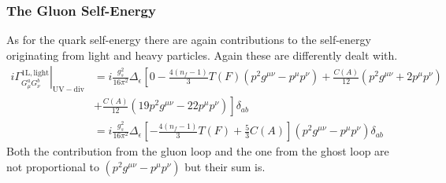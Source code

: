 \subsubsection*{The Gluon Self-Energy}
As for the quark self-energy there are again contributions to the self-energy originating from light and heavy particles. Again these are differently dealt with.
\begin{align}
\left.i\Gamma^{\mathrm{1L,light}}_{G_\mu^a G_\nu^b}\right|_{\mathrm{UV-div}} &= i\frac{g_s^2}{16\pi^2}\Delta_\epsilon \left[ 0 - \frac{4 (n_{f}-1)}{3} T(F) (p^2g^{\mu\nu}-p^\mu p^\nu) + \frac{C(A)}{12}(p^2g^{\mu\nu} + 2 p^\mu p^\nu) \right.\nonumber\\
&+\left. \frac{C(A)}{12}(19 p^2g^{\mu\nu} - 22 p^\mu p^\nu) \right]\delta_{ab}\nonumber\\
&=i\frac{g_s^2}{16\pi^2} \Delta_\epsilon \left[ - \frac{4 (n_{f}-1)}{3} T(F) + \frac{5}{3} C(A) \right](p^2g^{\mu\nu}-p^\mu p^\nu)\delta_{ab}
\end{align}
Both the contribution from the gluon loop and the one from the ghost loop are not proportional to $(p^2g^{\mu\nu}-p^\mu p^\nu)$ but their sum is.
